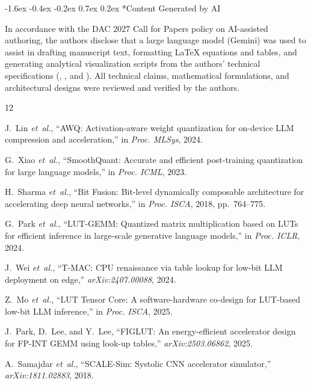 \documentclass[10pt,letterpaper,twocolumn]{article}
\makeatletter
\renewcommand\section{\@startsection {section}{1}{\z@}%
  {-1.6ex \@plus -0.4ex \@minus -0.2ex}%
  {0.7ex \@plus 0.2ex}%
  {\normalfont\large\bfseries\color{primary}}}
\makeatother
\begin{document}
\section*{Content Generated by AI}
{\footnotesize
In accordance with the DAC 2027 Call for Papers policy on AI-assisted authoring, the authors disclose that a large language model (Gemini) was used to assist in drafting manuscript text, formatting LaTeX equations and tables, and generating analytical visualization scripts from the authors' technical specifications (, , and ). All technical claims, mathematical formulations, and architectural designs were reviewed and verified by the authors.\par}

\begin{thebibliography}{12}
\footnotesize
\setlength{\itemsep}{0.5pt}\setlength{\parskip}{0pt}

J.~Lin \emph{et~al.}, ``AWQ: Activation-aware weight quantization for on-device LLM compression and acceleration,'' in \emph{Proc. MLSys}, 2024.

G.~Xiao \emph{et~al.}, ``SmoothQuant: Accurate and efficient post-training quantization for large language models,'' in \emph{Proc. ICML}, 2023.

H.~Sharma \emph{et~al.}, ``Bit Fusion: Bit-level dynamically composable architecture for accelerating deep neural networks,'' in \emph{Proc. ISCA}, 2018, pp.~764--775.

G.~Park \emph{et~al.}, ``LUT-GEMM: Quantized matrix multiplication based on LUTs for efficient inference in large-scale generative language models,'' in \emph{Proc. ICLR}, 2024.

J.~Wei \emph{et~al.}, ``T-MAC: CPU renaissance via table lookup for low-bit LLM deployment on edge,'' \emph{arXiv:2407.00088}, 2024.

Z.~Mo \emph{et~al.}, ``LUT Tensor Core: A software-hardware co-design for LUT-based low-bit LLM inference,'' in \emph{Proc. ISCA}, 2025.

J.~Park, D.~Lee, and Y.~Lee, ``FIGLUT: An energy-efficient accelerator design for FP-INT GEMM using look-up tables,'' \emph{arXiv:2503.06862}, 2025.

A.~Samajdar \emph{et~al.}, ``SCALE-Sim: Systolic CNN accelerator simulator,'' \emph{arXiv:1811.02883}, 2018.


\end{thebibliography}
\end{document}
